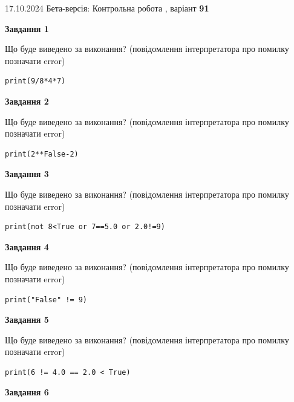 \documentclass[12pt, ukrainian]{article}
\begin{document}
{\Large{17.10.2024 Бета-версія: Контрольна робота , варіант  \No \textbf { 91 }\par}}
{
\begin {large}
{\begin {center}\textbf{Завдання 1}\end {center}}

Що буде виведено за виконання? (повідомлення інтерпретатора про помилку позначати error)\par
\begin{verbatim}
print(9/8*4*7)
\end{verbatim}

{\begin {center}\textbf{Завдання 2}\end {center}}

Що буде виведено за виконання? (повідомлення інтерпретатора про помилку позначати error)\par
\begin{verbatim}
print(2**False-2)
\end{verbatim}

{\begin {center}\textbf{Завдання 3}\end {center}}

Що буде виведено за виконання? (повідомлення інтерпретатора про помилку позначати error)\par
\begin{verbatim}
print(not 8<True or 7==5.0 or 2.0!=9)
\end{verbatim}

{\begin {center}\textbf{Завдання 4}\end {center}}

Що буде виведено за виконання? (повідомлення інтерпретатора про помилку позначати error)\par
\begin{verbatim}
print("False" != 9)
\end{verbatim}

{\begin {center}\textbf{Завдання 5}\end {center}}

Що буде виведено за виконання? (повідомлення інтерпретатора про помилку позначати error)\par
\begin{verbatim}
print(6 != 4.0 == 2.0 < True)
\end{verbatim}

{\begin {center}\textbf{Завдання 6}\end {center}}


\end{large}}
\end{document}
